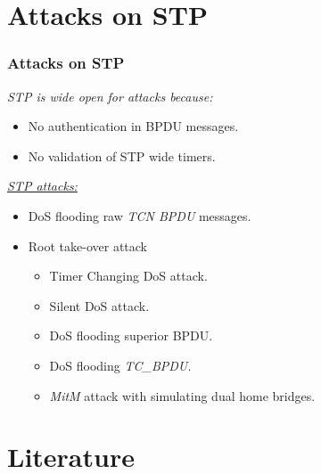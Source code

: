 \documentclass[10pt, blue,subsection=true, compress]{beamer}
\begin{document}
\section{Attacks on STP}
\begin{frame}
   \frametitle{Attacks on STP}
   \emph{STP is wide open for attacks because:}
   \begin{itemize}
   \item  No authentication in  BPDU messages.
   \item  No validation of STP wide timers.
   \end{itemize}
   \pause
  
   \underline{\emph{STP attacks:}} \\
   \begin{itemize}
   \item  DoS flooding raw \textit{TCN BPDU} messages.
   \item  Root take-over attack
   
    
     
     \begin{itemize}
     
      \item Timer Changing DoS attack.
       \item Silent DoS attack.
      \item DoS flooding superior BPDU.
      \item DoS flooding \textit{TC\_BPDU.}
      \item \textit{MitM} attack with simulating dual home bridges.
    
     \end{itemize}
     
\end{itemize}
    
  \end{frame}	
\section{Literature}
\end{document}
